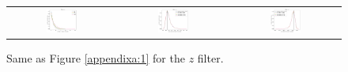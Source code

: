\documentclass[preprintm,linenumbers]{aastex631}
\begin{document}
   \begin{figure}[h]
			\centering
			\begin{tabular}{c c c}
				
				\includegraphics[width=0.3\textwidth]{results/histograms_templates_tscale/hist_first_year_one_snap_v4_0_10yrs_db_noDD_noTwi_doALLTemplateMetrics_reduceNTemplate_z_noDD_noTwi.pdf} &
				\includegraphics[width=0.3\textwidth]{results/histograms_templates_tscale/hist_first_year_one_snap_v4_0_10yrs_db_noDD_noTwi_doALLTemplateMetrics_reduceSeeingTemplate_z_noDD_noTwi.pdf} &
				\includegraphics[width=0.3\textwidth]{results/histograms_templates_tscale/hist_first_year_one_snap_v4_0_10yrs_db_noDD_noTwi_doALLTemplateMetrics_reduceDepthTemplate_z_noDD_noTwi.pdf} \\
				
			\end{tabular}
			\caption{
				Same as Figure \ref{appendixa:1} for the $z$ filter.  \label{appendixa:5}
			}
		\end{figure}
\end{document}
